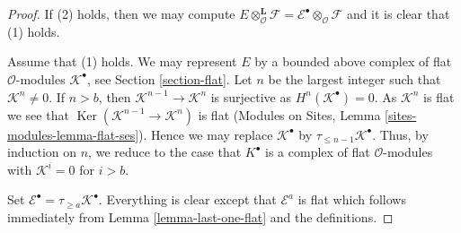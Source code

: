 \documentclass[10pt,a4paper]{amsart}
\theoremstyle{plain}
\theoremstyle{definition}
\theoremstyle{remark}
\numberwithin{equation}{subsection}
\def\Ker{\mathop{\mathrm{Ker}}}
\begin{document}
\begin{proof}
If (2) holds, then we may compute
$E \otimes_\mathcal{O}^\mathbf{L} \mathcal{F} =
\mathcal{E}^\bullet \otimes_\mathcal{O} \mathcal{F}$
and it is clear that (1) holds.

\medskip\noindent
Assume that (1) holds. We may represent $E$ by a bounded above complex
of flat $\mathcal{O}$-modules $\mathcal{K}^\bullet$, see
Section \ref{section-flat}.
Let $n$ be the largest integer such that $\mathcal{K}^n \not = 0$.
If $n > b$, then $\mathcal{K}^{n - 1} \to \mathcal{K}^n$ is surjective as
$H^n(\mathcal{K}^\bullet) = 0$. As $\mathcal{K}^n$ is flat we see that
$\Ker(\mathcal{K}^{n - 1} \to \mathcal{K}^n)$ is flat
(Modules on Sites, Lemma \ref{sites-modules-lemma-flat-ses}).
Hence we may replace $\mathcal{K}^\bullet$ by
$\tau_{\leq n - 1}\mathcal{K}^\bullet$. Thus, by induction on $n$, we
reduce to the case that $K^\bullet$ is a complex of flat
$\mathcal{O}$-modules with $\mathcal{K}^i = 0$ for $i > b$.

\medskip\noindent
Set $\mathcal{E}^\bullet = \tau_{\geq a}\mathcal{K}^\bullet$.
Everything is clear except that $\mathcal{E}^a$ is flat
which follows immediately from Lemma \ref{lemma-last-one-flat}
and the definitions.
\end{proof}
\end{document}
